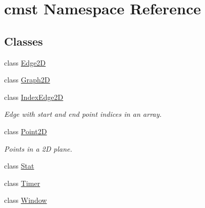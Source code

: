 \hypertarget{namespacecmst}{}\section{cmst Namespace Reference}
\label{namespacecmst}
\subsection*{Classes}
\begin{DoxyCompactItemize}
\item 
class \hyperlink{classcmst_1_1_edge2_d}{Edge2D}
\item 
class \hyperlink{classcmst_1_1_graph2_d}{Graph2D}
\item 
class \hyperlink{classcmst_1_1_index_edge2_d}{Index\+Edge2D}
\begin{DoxyCompactList}\small\item\em Edge with start and end point indices in an array. \end{DoxyCompactList}\item 
class \hyperlink{classcmst_1_1_point2_d}{Point2D}
\begin{DoxyCompactList}\small\item\em Points in a 2D plane. \end{DoxyCompactList}\item 
class \hyperlink{classcmst_1_1_stat}{Stat}
\item 
class \hyperlink{classcmst_1_1_timer}{Timer}
\item 
class \hyperlink{classcmst_1_1_window}{Window}
\end{DoxyCompactItemize}
